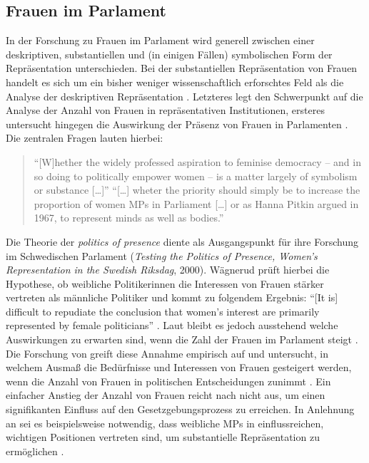 \documentclass[12pt, 
    twoside=false, 
    bibliography=totoc, 
    numbers=endperiod, 
    headings=normal, 
    toc=chapterentrydotfill
    ]{scrbook}
\begin{document}

\subsection{Frauen im Parlament}

In der Forschung zu Frauen im Parlament wird generell zwischen einer deskriptiven, substantiellen und (in einigen Fällen) symbolischen Form der Repräsentation unterschieden. Bei der substantiellen Repräsentation von Frauen handelt es sich um ein bisher weniger wissenschaftlich erforschtes Feld als die Analyse der deskriptiven Repräsentation \parencite[59]{wangnerud_2009}. 
Letzteres legt den Schwerpunkt auf die Analyse der Anzahl von Frauen in repräsentativen Institutionen, ersteres untersucht hingegen die Auswirkung der Präsenz von Frauen in Parlamenten \parencites[14]{coffe_2013}[52]{wangnerud_2009}.
Die zentralen Fragen lauten hierbei:

\citereset
\begin{quote}
  \enquote{[W]hether the widely professed aspiration to feminise democracy -- and in so doing to politically empower women -- is a matter largely of symbolism or substance […]}
  \enquote{[…] wheter the priority should simply be to increase the proportion of women MPs in Parliament […] or as Hanna Pitkin argued in 1967, to represent minds as well as bodies.}
  \parencite[413]{blaxill_2016}
\end{quote}

%
Die Theorie der \emph{politics of presence} \parencite{phillips_1998} diente \textcite{wangnerud_2000} als Ausgangspunkt für ihre Forschung im Schwedischen Parlament (\emph{Testing the Politics of Presence, Women's Representation in the Swedish Riksdag}, 2000). Wägnerud prüft hierbei die Hypothese, ob weibliche Politikerinnen die Interessen von Frauen stärker vertreten als männliche Politiker \parencite[84]{wangnerud_2000} und kommt zu folgendem Ergebnis: \enquote{[It is] difficult to repudiate the conclusion that women's interest are primarily represented by female politicians} \parencite[][84]{wangnerud_2000}. Laut\citeauthor{wangnerud_2000} bleibt es jedoch ausstehend welche Auswirkungen zu erwarten sind, wenn die Zahl der Frauen im Parlament steigt \parencite{wangnerud_2009}.
Die Forschung von \textcite{celis_2008} greift diese Annahme empirisch auf und untersucht, in welchem Ausmaß die Bedürfnisse und Interessen von Frauen gesteigert werden, wenn die Anzahl von Frauen in politischen Entscheidungen zunimmt \parencite[vgl. auch][4]{galligan_2016}. Ein einfacher Anstieg der Anzahl von Frauen reicht nach \textcite{celis_2008} nicht aus, um einen signifikanten Einfluss auf den Gesetzgebungsprozess zu erreichen. In Anlehnung an \textcite{caul_2001} sei es beispielsweise notwendig, dass weibliche MPs in einflussreichen, wichtigen Positionen vertreten sind, um substantielle Repräsentation zu ermöglichen \parencites{caul_2001}[vgl. auch][14]{coffe_2013}.
\end{document}
